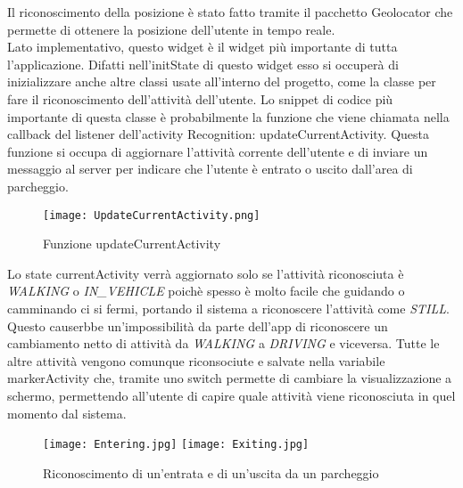 \documentclass[../../Report.tex]{subfiles}
\begin{document}
Il riconoscimento della posizione è stato fatto tramite il pacchetto Geolocator che permette di ottenere la posizione dell'utente in tempo reale.\\

Lato implementativo, questo widget è il widget più importante di tutta l'applicazione. Difatti nell'initState di questo widget esso si occuperà di inizializzare anche altre classi usate all'interno del progetto, come la classe per fare il riconoscimento dell'attività dell'utente. Lo snippet di codice più importante di questa classe è probabilmente la funzione che viene chiamata nella callback del listener dell'activity Recognition: updateCurrentActivity. Questa funzione si occupa di aggiornare l'attività corrente dell'utente e di inviare un messaggio al server per indicare che l'utente è entrato o uscito dall'area di parcheggio.\\
\begin{figure}[H]
  \centering
  \texttt{[image: UpdateCurrentActivity.png]}
  \caption{Funzione updateCurrentActivity}
\end{figure}
Lo state currentActivity verrà aggiornato solo se l'attività riconosciuta è \emph{WALKING} o \emph{IN\_VEHICLE} poichè spesso è molto facile che guidando o camminando ci si fermi, portando il sistema a riconoscere l'attività come \emph{STILL}. Questo causerbbe un'impossibilità da parte dell'app di riconoscere un cambiamento netto di attività da \emph{WALKING} a \emph{DRIVING} e viceversa. Tutte le altre attività vengono comunque riconsociute e salvate nella variabile markerActivity che, tramite uno switch permette di cambiare la visualizzazione a schermo, permettendo all'utente di capire quale attività viene riconosciuta in quel momento dal sistema.\\
\begin{figure}[H]
  \centering
  \texttt{[image: Entering.jpg]}
  \texttt{[image: Exiting.jpg]}

  \caption{Riconoscimento di un'entrata e di un'uscita da un parcheggio}
\end{figure}
\end{document}
